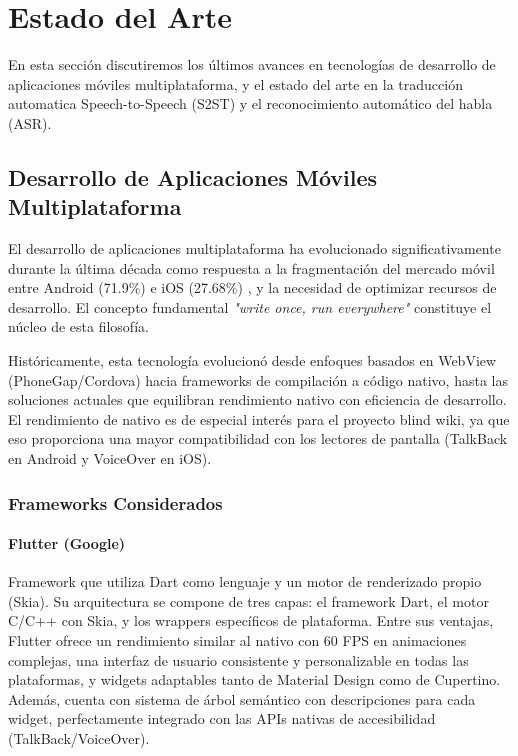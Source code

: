 \section{Estado del Arte}

En esta sección discutiremos los últimos avances en tecnologías de desarrollo de aplicaciones móviles multiplataforma, y el estado del arte en la traducción automatica Speech-to-Speech (S2ST) y el reconocimiento automático del habla (ASR).

\subsection{Desarrollo de Aplicaciones Móviles Multiplataforma}

El desarrollo de aplicaciones multiplataforma ha evolucionado significativamente durante la última década como respuesta a la fragmentación del mercado móvil entre Android (71.9\%) e iOS (27.68\%) \cite{statcounter2025}, y la necesidad de optimizar recursos de desarrollo. El concepto fundamental \textit{"write once, run everywhere"} constituye el núcleo de esta filosofía.

Históricamente, esta tecnología evolucionó desde enfoques basados en WebView (PhoneGap/Cordova) hacia frameworks de compilación a código nativo, hasta las soluciones actuales que equilibran rendimiento nativo con eficiencia de desarrollo. El rendimiento de nativo es de especial interés para el proyecto blind wiki, ya que eso proporciona una mayor compatibilidad con los lectores de pantalla (TalkBack en Android y VoiceOver en iOS).

\subsubsection{Frameworks Considerados}

\paragraph{Flutter (Google)}
Framework que utiliza Dart como lenguaje y un motor de renderizado propio (Skia). Su arquitectura se compone de tres capas: el framework Dart, el motor C/C++ con Skia, y los wrappers específicos de plataforma. Entre sus ventajas, Flutter ofrece un rendimiento similar al nativo con 60 FPS en animaciones complejas, una interfaz de usuario consistente y personalizable en todas las plataformas, y widgets adaptables tanto de Material Design como de Cupertino. Además, cuenta con sistema de árbol semántico con descripciones para cada widget, perfectamente integrado con las APIs nativas de accesibilidad (TalkBack/VoiceOver).


